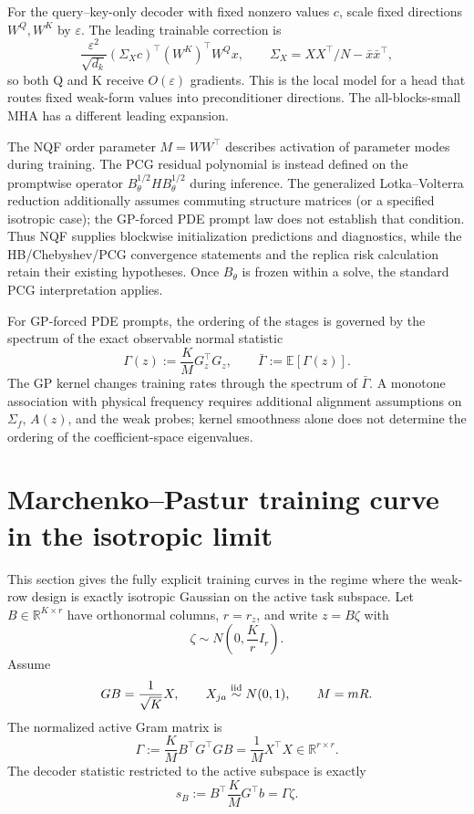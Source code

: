 \documentclass[11pt,a4paper]{article}
\theoremstyle{definition}
\newcommand{\R}{\mathbb R}
\newcommand{\E}{\mathbb E}
\begin{document}
For the query--key-only decoder with fixed nonzero values $c$, scale fixed
directions \(W^Q,W^K\) by \(\varepsilon\). The leading trainable correction is
\[
 \frac{\varepsilon^2}{\sqrt{d_k}}
 (\Sigma_Xc)^\top(W^K)^\top W^Qx,
 \qquad
 \Sigma_X=XX^\top/N-\bar x\bar x^\top,
\]
so both Q and K receive $O(\varepsilon)$ gradients.  This is the local model
for a head that routes fixed weak-form values into preconditioner directions.
The all-blocks-small MHA has a different leading expansion.

The NQF order parameter $M=WW^\top$ describes activation of parameter modes
during training.  The PCG residual polynomial is instead defined on the
promptwise operator $B_\theta^{1/2}HB_\theta^{1/2}$ during inference.
The generalized Lotka--Volterra reduction additionally assumes commuting
structure matrices (or a specified isotropic case); the GP-forced PDE prompt
law does not establish that condition.  Thus NQF supplies blockwise
initialization predictions and diagnostics, while the HB/Chebyshev/PCG
convergence statements and the replica risk calculation retain their existing
hypotheses.  Once $B_\theta$ is frozen within a solve, the standard PCG
interpretation applies.

For GP-forced PDE prompts, the ordering of the stages is governed by the
spectrum of the exact observable normal statistic
\[
    \Gamma(z):=\frac{K}{M}G_z^\top G_z,
    \qquad
    \bar\Gamma:=\E[\Gamma(z)].
\]
The GP kernel changes training rates through the spectrum of
\(\bar\Gamma\). A monotone association with physical frequency requires
additional alignment assumptions on \(\Sigma_f\), \(A(z)\), and the weak
probes; kernel smoothness alone does not determine the ordering of the
coefficient-space eigenvalues.

\section{Marchenko--Pastur training curve in the isotropic limit}

This section gives the fully explicit training curves in the regime where the
weak-row design is exactly isotropic Gaussian on the active task subspace.  Let
$B\in\R^{K\times r}$ have orthonormal columns, $r=r_z$, and write
$z=B\zeta$ with
\[
    \zeta\sim N\!\left(0,\frac{K}{r}I_r\right).
\]
Assume
\[
    G B=\frac1{\sqrt K}X,
    \qquad
    X_{ja}\overset{\rm iid}{\sim}N(0,1),
    \qquad
    M=mR.
\]
The normalized active Gram matrix is
\[
    \Gamma
    :=
    \frac{K}{M}B^\top G^\top G B
    =
    \frac1M X^\top X
    \in\R^{r\times r}.
\]
The decoder statistic restricted to the active subspace is exactly
\[
    s_B:=B^\top\frac{K}{M}G^\top b
    =
    \Gamma\zeta .
\]
\end{document}
